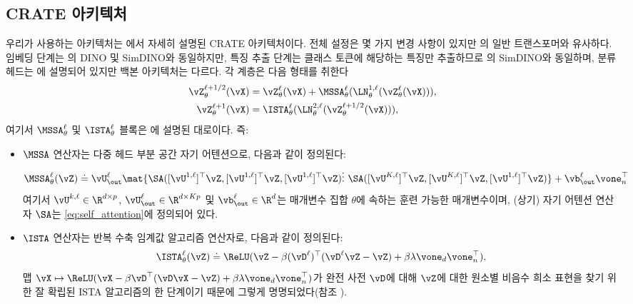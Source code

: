 \documentclass[../../book-main_ko.tex]{subfiles}
\begin{document}
\subsection{CRATE 아키텍처}\label{sub:image_classification_architecture}

우리가 사용하는 아키텍처는 에서 자세히 설명된 CRATE 아키텍처이다. 전체 설정은 몇 가지 변경 사항이 있지만 의 일반 트랜스포머와 유사하다. 임베딩 단계는 의 DINO 및 SimDINO와 동일하지만, 특징 추출 단계는 클래스 토큰에 해당하는 특징만 추출하므로 의 SimDINO와 동일하며, 분류 헤드는 에 설명되어 있지만 백본 아키텍처는 다르다. 각 계층은 다음 형태를 취한다
\begin{align}\label{eq:CARTE updates}
    \vZ_{\theta}^{\ell + 1/2}(\vX)
    &= \vZ_{\theta}^{\ell}(\vX) + \MSSA_{\theta}^{\ell}(\LN_{\theta}^{1, \ell}(\vZ_{\theta}^{\ell}(\vX))), \\
    \vZ_{\theta}^{\ell + 1}(\vX)
    &= \ISTA_{\theta}^{\ell}(\LN_{\theta}^{2, \ell}(\vZ_{\theta}^{\ell + 1/2}(\vX))),
\end{align}
여기서 \(\MSSA_{\theta}^{\ell}\) 및 \(\ISTA_{\theta}^{\ell}\) 블록은 에 설명된 대로이다. 즉:
\begin{itemize}
    \item \(\MSSA\) 연산자는 다중 헤드 부분 공간 자기 어텐션으로, 다음과 같이 정의된다:
    \begin{equation}
        \MSSA_{\theta}^{\ell}(\vZ) \doteq \vU_{\out}^{\ell}\mat{\SA([\vU^{1, \ell}]^{\top}\vZ, [\vU^{1, \ell}]^{\top}\vZ, [\vU^{1, \ell}]^{\top}\vZ)
\vdots \ \SA([\vU^{K, \ell}]^{\top}\vZ, [\vU^{K, \ell}]^{\top}\vZ, [\vU^{1, \ell}]^{\top}\vZ)} + \vb_{\out}^{\ell}\vone_{n}^{\top}
    \end{equation}
    여기서 \(\vU^{k, \ell} \in \R^{d \times p}\), \(\vU_{\out}^{\ell} \in \R^{d \times Kp}\) 및 \(\vb_{\out}^{\ell} \in \R^{d}\)는 매개변수 집합 \(\theta\)에 속하는 훈련 가능한 매개변수이며, (상기) 자기 어텐션 연산자 \(\SA\)는 \eqref{eq:self_attention}에 정의되어 있다.
    \item \(\ISTA\) 연산자는 반복 수축 임계값 알고리즘 연산자로, 다음과 같이 정의된다:
    \begin{equation}
        \ISTA_{\theta}^{\ell}(\vZ) \doteq \ReLU(\vZ - \beta (\vD^{\ell})^{\top}(\vD^{\ell}\vZ - \vZ) + \beta \lambda \vone_{d}\vone_{n}^{\top}),
    \end{equation}
    맵 \(\vX \mapsto \ReLU(\vX - \beta \vD^{\top}(\vD\vX - \vZ) + \beta  \lambda \vone_{d}\vone_{n}^{\top})\)가 완전 사전 \(\vD\)에 대해 \(\vZ\)에 대한 원소별 비음수 희소 표현을 찾기 위한 잘 확립된 ISTA 알고리즘의 한 단계이기 때문에 그렇게 명명되었다(참조 ). 
\end{itemize}
\end{document}
